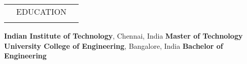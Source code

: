 \documentclass[a4paper, 13pt,line]{article}
\begin{document}
\begin{table}[H]
{\renewcommand{\arraystretch}{1.9}
\begin{tabularx}{\textwidth}{XcX}
\hline\hline\Xhline{2.5\arrayrulewidth}
\rowcolor{Gray}      &EDUCATION& \\
\Xhline{2.5\arrayrulewidth}
\hline
\end{tabularx}
}
\end{table}

\noindent\textbf{Indian Institute of Technology}, Chennai, India \hfill \textbf{Master of Technology}\vspace{1mm}\\
\textbf{University College of Engineering}, Bangalore, India \hfill \textbf{Bachelor of Engineering}\vspace{-1.5mm}\\%
\end{document}
